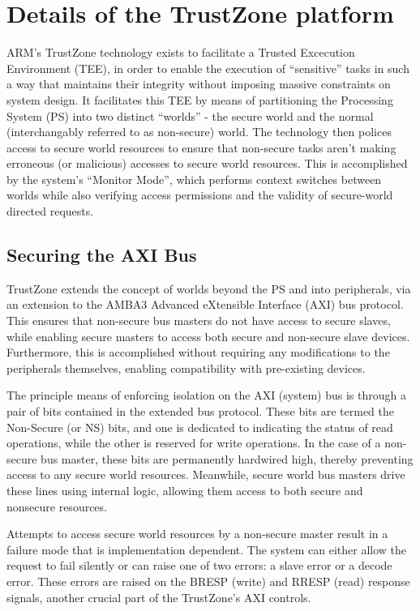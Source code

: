 \documentclass[journal]{IEEEtran}
\begin{document}
\section{Details of the TrustZone platform} \label{sec:TrustZone}
ARM's TrustZone technology exists to facilitate a Trusted Excecution Environment (TEE), in
order to enable the execution of ``sensitive'' tasks in such a way that maintains their
integrity without imposing massive constraints on system design. It facilitates this TEE
by means of partitioning the Processing System (PS) into two distinct ``worlds'' - the
secure world and the normal (interchangably referred to as non-secure) world. The
technology then polices access to secure world resources to ensure that non-secure tasks
aren't making erroneous (or malicious) accesses to secure world resources. This is
accomplished by the system's ``Monitor Mode'', which performs context switches between 
worlds while also verifying access permissions and the validity of secure-world directed 
requests.

\subsection{Securing the AXI Bus} \label{sec:Securing AXI Bus}
TrustZone extends the concept of worlds beyond the PS and into peripherals,
via an extension to the AMBA3 Advanced eXtensible Interface (AXI) bus protocol. This
ensures that non-secure bus masters do not have access to secure slaves, while enabling
secure masters to access both secure and non-secure slave devices. Furthermore, this is
accomplished without requiring any modifications to the peripherals themselves, enabling
compatibility with pre-existing devices.

The principle means of enforcing isolation on the AXI (system) bus is through a pair of
bits contained in the extended bus protocol. These bits are termed the Non-Secure (or NS)
bits, and one is dedicated to indicating the status of read operations, while the other is
reserved for write operations.\cite{benhani_security_2019} In the case of a non-secure bus
master, these bits are permanently hardwired high, thereby preventing access to any 
secure world resources. Meanwhile, secure world bus masters drive these lines using 
internal logic, allowing them access to both secure and nonsecure resources.

Attempts to access secure world resources by a non-secure master result in a failure mode
that is implementation dependent. The system can either allow the request to fail silently
or can raise one of two errors: a slave error or a decode error. These errors are raised
on the BRESP (write) and RRESP (read) response signals, another crucial part of the 
TrustZone's AXI controls. \cite{benhani_security_2017}
\end{document}

